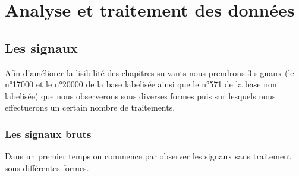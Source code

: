 
\hypertarget{Analyse-et-traitement-des-donnuxe9es}{%
\chapter{Analyse et traitement des données}\label{Analyse-et-traitement-des-donnuxe9es}}

\hypertarget{Les-signaux}{%
\section{Les signaux}
\label{Les-signaux}}

Afin d'améliorer la lisibilité des chapitres suivants nous prendrons 3 signaux (le n°17000 et le n°20000 de la base labelisée ainsi que le n°571 de la base non labelisée) que nous observerons sous diverses formes puis sur lesquels nous effectuerons un certain nombre de traitements.

\hypertarget{Signaux-Bruts}{%
\subsection{Les signaux bruts}
\label{Signaux-Bruts}}

Dans un premier temps on commence par observer les signaux sans traitement sous différentes formes.

